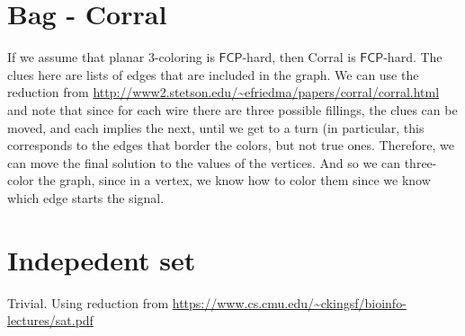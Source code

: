 \documentclass[runningheads,a4paper]{llncs}
\begin{document}
\section{Bag - Corral}

If we assume that planar 3-coloring is $\mathsf{FCP}$-hard, then Corral is $\mathsf{FCP}$-hard. The clues here are lists of edges that are included in the graph. We can use the reduction from \url{http://www2.stetson.edu/~efriedma/papers/corral/corral.html} and note that since for each wire there are three possible fillings, the clues can be moved, and each implies the next, until we get to a turn (in particular, this corresponds to the edges that border the colors, but not true ones. Therefore, we can move the final solution to the values of the vertices. And so we can  three-color the graph, since in a vertex, we know how to color them since we know which edge starts the signal.

\section{Indepedent set}

Trivial. Using reduction from \url{https://www.cs.cmu.edu/~ckingsf/bioinfo-lectures/sat.pdf}
\end{document}

